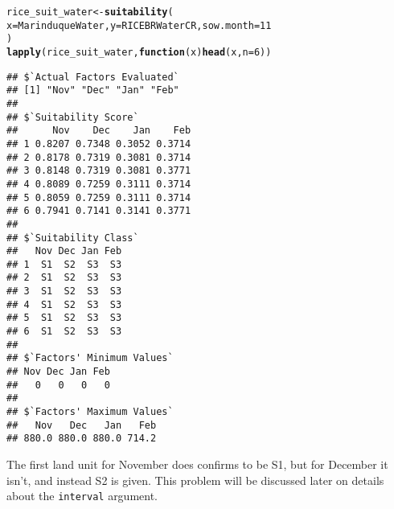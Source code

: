 \documentclass[11pt,fleqn]{article}\usepackage[]{graphicx}\usepackage[]{color}
\makeatletter
\newcommand{\hlnum}[1]{\textcolor[rgb]{0.686,0.059,0.569}{#1}}%
\newcommand{\hlstd}[1]{\textcolor[rgb]{0.345,0.345,0.345}{#1}}%
\newcommand{\hlkwa}[1]{\textcolor[rgb]{0.161,0.373,0.58}{\textbf{#1}}}%
\newcommand{\hlkwb}[1]{\textcolor[rgb]{0.69,0.353,0.396}{#1}}%
\newcommand{\hlkwc}[1]{\textcolor[rgb]{0.333,0.667,0.333}{#1}}%
\newcommand{\hlkwd}[1]{\textcolor[rgb]{0.737,0.353,0.396}{\textbf{#1}}}%
\newenvironment{kframe}{%
 \def\at@end@of@kframe{}%
 \ifinner\ifhmode%
  \def\at@end@of@kframe{\end{minipage}}%
  \begin{minipage}{\columnwidth}%
 \fi\fi%
 \def\FrameCommand##1{\hskip\@totalleftmargin \hskip-\fboxsep
 \colorbox{shadecolor}{##1}\hskip-\fboxsep
     \hskip-\linewidth \hskip-\@totalleftmargin \hskip\columnwidth}%
 \MakeFramed {\advance\hsize-\width
   \@totalleftmargin\z@ \linewidth\hsize
   \@setminipage}}%
 {\par\unskip\endMakeFramed%
 \at@end@of@kframe}
\newenvironment{knitrout}{}{} %
\makeatother
\begin{document}
\begin{knitrout}
\color{fgcolor}\begin{kframe}
\begin{alltt}
\hlstd{rice_suit_water} \hlkwb{<-} \hlkwd{suitability}\hlstd{(}
  \hlkwc{x} \hlstd{= MarinduqueWater,} \hlkwc{y} \hlstd{= RICEBRWaterCR,} \hlkwc{sow.month} \hlstd{=} \hlnum{11}
  \hlstd{)}
\hlkwd{lapply}\hlstd{(rice_suit_water,} \hlkwa{function}\hlstd{(}\hlkwc{x}\hlstd{)} \hlkwd{head}\hlstd{(x,} \hlkwc{n} \hlstd{=} \hlnum{6}\hlstd{))}
\end{alltt}
\begin{verbatim}
## $`Actual Factors Evaluated`
## [1] "Nov" "Dec" "Jan" "Feb"
## 
## $`Suitability Score`
##      Nov    Dec    Jan    Feb
## 1 0.8207 0.7348 0.3052 0.3714
## 2 0.8178 0.7319 0.3081 0.3714
## 3 0.8148 0.7319 0.3081 0.3771
## 4 0.8089 0.7259 0.3111 0.3714
## 5 0.8059 0.7259 0.3111 0.3714
## 6 0.7941 0.7141 0.3141 0.3771
## 
## $`Suitability Class`
##   Nov Dec Jan Feb
## 1  S1  S2  S3  S3
## 2  S1  S2  S3  S3
## 3  S1  S2  S3  S3
## 4  S1  S2  S3  S3
## 5  S1  S2  S3  S3
## 6  S1  S2  S3  S3
## 
## $`Factors' Minimum Values`
## Nov Dec Jan Feb 
##   0   0   0   0 
## 
## $`Factors' Maximum Values`
##   Nov   Dec   Jan   Feb 
## 880.0 880.0 880.0 714.2
\end{verbatim}
\end{kframe}
\end{knitrout}
The first land unit for November does confirms to be S1, but for December it isn't, and instead S2 is given. This problem will be discussed later on details about the \verb|interval| argument.
\end{document}
